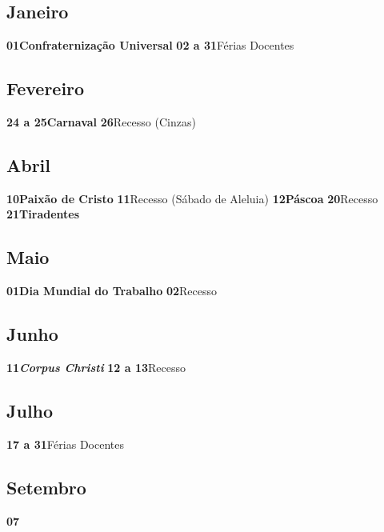\documentclass[thesis]{hmcposter}
\begin{document}
\begin{poster}
\newpage\subsection{Janeiro}\textbf{01}\quad \quad \quad \quad \textbf{Confraternização Universal} \newline\textbf{02 a 31}\quad \quad Férias Docentes \subsection{Fevereiro}\textbf{24 a 25}\quad \quad \textbf{Carnaval} \newline\textbf{26}\quad \quad \quad \quad Recesso (Cinzas) \subsection{Abril}\textbf{10}\quad \quad \quad \quad \textbf{Paixão de Cristo} \newline\textbf{11}\quad \quad \quad \quad Recesso (Sábado de Aleluia) \newline\textbf{12}\quad \quad \quad \quad \textbf{Páscoa} \newline\textbf{20}\quad \quad \quad \quad Recesso \newline\textbf{21}\quad \quad \quad \quad \textbf{Tiradentes} \subsection{Maio}\textbf{01}\quad \quad \quad \quad \textbf{Dia Mundial do Trabalho} \newline\textbf{02}\quad \quad \quad \quad Recesso \subsection{Junho}\textbf{11}\quad \quad \quad \quad \textbf{\textit{Corpus Christi}} \newline\textbf{12 a 13}\quad \quad Recesso \subsection{Julho}\textbf{17 a 31}\quad \quad Férias Docentes \subsection{Setembro}\textbf{07}\quad \quad 
\end{poster}
\end{document}
